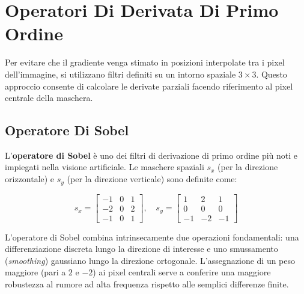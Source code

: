 ﻿\documentclass[11pt, a4paper]{article}
\begin{document}

\newpage

\section{Operatori Di Derivata Di Primo Ordine}

Per evitare che il gradiente venga stimato in posizioni interpolate tra i pixel dell'immagine, si utilizzano filtri definiti su un intorno spaziale $3 \times 3$. Questo approccio consente di calcolare le derivate parziali facendo riferimento al pixel centrale della maschera.

\subsection{Operatore Di Sobel}

L'\textbf{operatore di Sobel} è uno dei filtri di derivazione di primo ordine più noti e impiegati nella visione artificiale. Le maschere spaziali $s_x$ (per la direzione orizzontale) e $s_y$ (per la direzione verticale) sono definite come:

\[ s_x = \begin{bmatrix} -1 & 0 & 1 \\ -2 & 0 & 2 \\ -1 & 0 & 1 \end{bmatrix}, \quad s_y = \begin{bmatrix} 1 & 2 & 1 \\ 0 & 0 & 0 \\ -1 & -2 & -1 \end{bmatrix} \]

L'operatore di Sobel combina intrinsecamente due operazioni fondamentali: una differenziazione discreta lungo la direzione di interesse e uno smussamento (\emph{smoothing}) gaussiano lungo la direzione ortogonale. L'assegnazione di un peso maggiore (pari a $2$ e $-2$) ai pixel centrali serve a conferire una maggiore robustezza al rumore ad alta frequenza rispetto alle semplici differenze finite.


\end{document}
